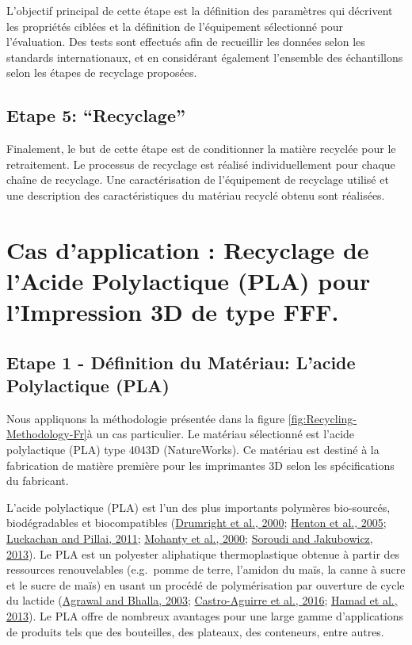 \documentclass[
]{article}
\begin{document}
L'objectif principal de cette étape est la définition des paramètres qui décrivent les propriétés ciblées et la définition de l'équipement sélectionné pour l'évaluation. Des tests sont effectués afin de recueillir les données selon les standards internationaux, et en considérant également l'ensemble des échantillons selon les étapes de recyclage proposées.

\hypertarget{Step5}{%
\subsection{Etape 5: ``Recyclage''}\label{Step5}}

Finalement, le but de cette étape est de conditionner la matière recyclée pour le retraitement. Le processus de recyclage est réalisé individuellement pour chaque chaîne de recyclage. Une caractérisation de l'équipement de recyclage utilisé et une description des caractéristiques du matériau recyclé obtenu sont réalisées.

\hypertarget{cas-dapplication-recyclage-de-lacide-polylactique-pla-pour-limpression-3d-de-type-fff.}{%
\section{Cas d'application : Recyclage de l'Acide Polylactique (PLA) pour l'Impression 3D de type FFF.}\label{cas-dapplication-recyclage-de-lacide-polylactique-pla-pour-limpression-3d-de-type-fff.}}

\hypertarget{etape-1---duxe9finition-du-matuxe9riau-lacide-polylactique-pla}{%
\subsection{Etape 1 - Définition du Matériau: L'acide Polylactique (PLA)}\label{etape-1---duxe9finition-du-matuxe9riau-lacide-polylactique-pla}}

Nous appliquons la méthodologie présentée dans la figure \ref{fig:Recycling-Methodology-Fr}à un cas particulier.
Le matériau sélectionné est l'acide polylactique (PLA) type 4043D (NatureWorks). Ce matériau est destiné à la fabrication de matière première pour les imprimantes 3D selon les spécifications du fabricant.

L'acide polylactique (PLA) est l'un des plus importants polymères bio-sourcés, biodégradables et biocompatibles (\protect\hyperlink{ref-Drumright2000}{Drumright et al., 2000}; \protect\hyperlink{ref-Henton2005}{Henton et al., 2005}; \protect\hyperlink{ref-Luckachan2011}{Luckachan and Pillai, 2011}; \protect\hyperlink{ref-Mohanty2000}{Mohanty et al., 2000}; \protect\hyperlink{ref-Soroudi2013}{Soroudi and Jakubowicz, 2013}).
Le PLA est un polyester aliphatique thermoplastique obtenue à partir des ressources renouvelables (e.g.~pomme de terre, l'amidon du maïs, la canne à sucre et le sucre de maïs) en usant un procédé de polymérisation par ouverture de cycle du lactide (\protect\hyperlink{ref-Agrawal2003}{Agrawal and Bhalla, 2003}; \protect\hyperlink{ref-Castro-Aguirre2016}{Castro-Aguirre et al., 2016}; \protect\hyperlink{ref-Hamad2013}{Hamad et al., 2013}).
Le PLA offre de nombreux avantages pour une large gamme d'applications de produits tels que des bouteilles, des plateaux, des conteneurs, entre autres.
\end{document}

